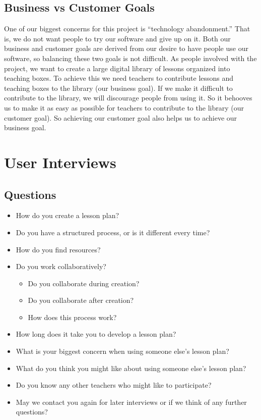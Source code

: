 \documentclass[10pt,letter]{article}
\begin{document}
\subsection{Business vs Customer Goals}
One of our biggest concerns for this project is ``technology abandonment.'' That
is, we do not want people to try our software and give up on it. Both our
business and customer goals are derived from our desire to have people use our
software, so balancing these two goals is not difficult. As people involved with
the project, we want to create a large digital library of lessons organized into
teaching boxes. To achieve this we need teachers to contribute lessons and
teaching boxes to the library (our business goal). If we make it difficult to
contribute to the library, we will discourage people from using it. So it
behooves us to make it as easy as possible for teachers to contribute to the
library (our customer goal). So achieving our customer goal also helps us to
achieve our business goal.

\pagebreak
\appendix

\section{User Interviews}

\subsection{Questions}
\label{interview questions}
\begin{itemize}
	\item How do you create a lesson plan?

	\item Do you have a structured process, or is it different every time?

	\item How do you find resources?

	\item Do you work collaboratively?
	\begin{itemize}
		\item Do you collaborate during creation?

		\item Do you collaborate after creation?

		\item How does this process work?
	\end{itemize}

	\item How long does it take you to develop a lesson plan?

	\item What is your biggest concern when using someone else's lesson plan?

	\item What do you think you might like about using someone else's lesson
		plan?

	\item Do you know any other teachers who might like to participate?

	\item May we contact you again for later interviews or if we think of any
		further questions?
\end{itemize}
\end{document}
